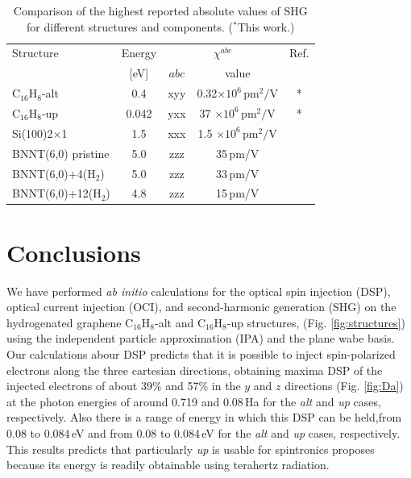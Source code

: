 \documentclass[pss]{wiley2sp} %
\begin{document}
\begin{table}[htb]%
  \sidecaption
  \begin{tabular}{lcccc}
  \hline
    Structure & \hspace{-5mm}Energy & \multicolumn{2}{c}{$\chi^{abc} $} &  Ref.\\
    \cline{3-4}
              & \hspace{-5mm}[eV]   & $abc$ & value \\
    \hline
    C$_{16}$H$_{8}$-alt   & \hspace{-5mm}0.4   & xyy   & 0.32\scriptsize{$\times 10^{6}\,\mathrm{pm}^{2}/\mathrm{V}$}  & *     \\
    C$_{16}$H$_{8}$-up    & \hspace{-5mm}0.042 & yxx   & 37  \scriptsize{$\times 10^{6}\,\mathrm{pm}^{2}/\mathrm{V}$}  & *     \\
    Si(100)2$\times$1     & \hspace{-5mm}1.5   & xxx   & 1.5 \scriptsize{$\times 10^{6}\,\mathrm{pm}^{2}/\mathrm{V}$}  & \cite{andersonPRB15}  \\
    BNNT(6,0) pristine    & \hspace{-5mm}5.0   & zzz   & 35\,\scriptsize{pm/V}  & \cite{salazarPRB14} \\
    BNNT(6,0)+4(H$_{2}$)  & \hspace{-5mm}5.0   & zzz   & 33\,\scriptsize{pm/V}  & \cite{salazarPRB14} \\
    BNNT(6,0)+12(H$_{2}$) & \hspace{-5mm}4.8   & zzz   & 15\,\scriptsize{pm/V}  & \cite{salazarPRB14} \\
  \hline
  \end{tabular}
  \caption[]{%
  Comparison of the highest reported absolute values of SHG for 
    different structures and components. ($^{*}$This work.)}
  \label{tab:shgcomp}
\end{table}

\section{Conclusions}\label{sec:conclusions}

We have performed \emph{ab initio} calculations for the optical spin injection (DSP), optical current injection (OCI), and second-harmonic generation (SHG) on the hydrogenated graphene C$_{16}$H$_{8}$-alt and C$_{16}$H$_{8}$-up structures, (Fig. \ref{fig:structures}) using the independent particle approximation (IPA) and the plane wabe basis. Our calculations abour DSP predicts that it is possible to inject spin-polarized electrons along the three cartesian directions, obtaining maxima DSP of the injected electrons of about 39\% and 57\% in the $y$ and $z$ directions  (Fig. \ref{fig:Da}) at the photon energies of around 0.719 and 0.08\,Ha  for the \emph{alt} and \emph{up} cases, respectively. Also there is a range of energy in which this DSP can be held,{\changed from 0.08 to 0.084\,eV and from 0.08 to 0.084\,eV for the \emph{alt} and \emph{up} cases, respectively}. This results predicts that particularly \emph{up} is usable for spintronics proposes because its energy is readily obtainable using terahertz radiation.
\end{document}
